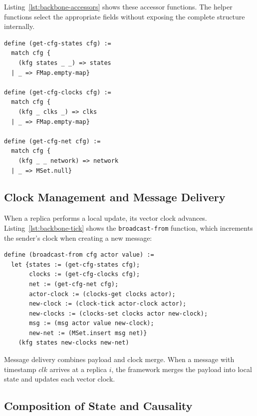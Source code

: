 Listing~\ref{lst:backbone-accessors} shows these accessor functions.
The helper functions select the appropriate fields without exposing the complete structure internally.

\begin{lstlisting}[language=Athena,style=athena,label={lst:backbone-accessors},caption={Backbone configuration accessors: encapsulating internal structure}]
define (get-cfg-states cfg) :=
  match cfg {
    (kfg states _ _) => states
  | _ => FMap.empty-map}
  
define (get-cfg-clocks cfg) :=
  match cfg {
    (kfg _ clks _) => clks
  | _ => FMap.empty-map}
  
define (get-cfg-net cfg) :=
  match cfg {
    (kfg _ _ network) => network
  | _ => MSet.null}
\end{lstlisting}

\subsection{Clock Management and Message Delivery}

When a replica performs a local update, its vector clock advances. Listing~\ref{lst:backbone-tick} shows the \texttt{broadcast-from} function, which increments the sender's clock when creating a new message:

\begin{lstlisting}[language=Athena,style=athena,label={lst:backbone-tick},caption={Clock ticking in broadcast-from function}]
define (broadcast-from cfg actor value) :=
  let {states := (get-cfg-states cfg);
       clocks := (get-cfg-clocks cfg);
       net := (get-cfg-net cfg);
       actor-clock := (clocks-get clocks actor);
       new-clock := (clock-tick actor-clock actor);
       new-clocks := (clocks-set clocks actor new-clock);
       msg := (msg actor value new-clock);
       new-net := (MSet.insert msg net)}
    (kfg states new-clocks new-net)
\end{lstlisting}

Message delivery combines payload and clock merge. When a message with timestamp $clk$ arrives at a replica $i$, the framework merges the payload into local state and updates each vector clock.

\subsection{Composition of State and Causality}

